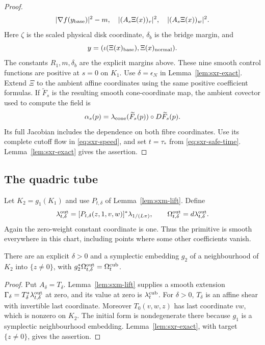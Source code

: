\begin{proof}
\[\begin{gathered}
 |\nabla f(y_{\rm base})|^2-m,\quad
 |(A_s\Xi(x))_v|^2,\quad |(A_s\Xi(x))_w|^2.
 \end{gathered}
\]
Here $\zeta$ is the scaled physical disk coordinate, $\delta_b$ is the bridge
margin, and
\[
 y=(\iota(\Xi(x)_{\rm base}),\Xi(x)_{\rm normal}).
\]
The constants $R_1,m,\delta_b$ are the explicit margins above. These nine smooth control functions are positive at $s=0$ on $K_1$.
Use $\delta=\epsilon_N$ in Lemma~\ref{lem:sxr-exact}.
Extend $\Xi$ to the ambient affine coordinates using the same positive
coefficient formulas. If $\widetilde F_s$ is the resulting smooth cone-coordinate
map, the ambient covector used to compute the field is
\[
 \alpha_s(p)=\lambda_{\rm cone}(\widetilde F_s(p))\circ D\widetilde F_s(p).
\]
Its full Jacobian includes the dependence on both fibre coordinates.
Use its complete cutoff flow in \eqref{eq:sxr-speed}, and set $t=\tau_*$ from
\eqref{eq:sxr-safe-time}. Lemma~\ref{lem:sxr-exact} gives the assertion.
\end{proof}

\subsection{The quadric tube}\label{sec:sxr-return}

Let $K_2=g_1(K_1)$ and use $P_{t,\delta}$ of Lemma~\ref{lem:sxm-lift}.
Define
\[
 \lambda_{t,\delta}^{\rm out}
  =[P_{t,\delta}(z,1,v,w)]^*\lambda_{1/(L\pi)},\qquad
 \Omega_{t,\delta}^{\rm out}=d\lambda_{t,\delta}^{\rm out}.
\]
Again the zero-weight constant coordinate is one. Thus the primitive is smooth
everywhere in this chart, including points where some other coefficients vanish.

\begin{proposition}\label{prop:sxr-quadric-return}
There are an explicit $\delta>0$ and a symplectic embedding $g_2$ of a
neighbourhood of $K_2$ into $\{z\ne0\}$, with
$g_2^*\Omega_{t,\delta}^{\rm out}=\Omega_t^{\rm cub}$.
\end{proposition}

\begin{proof}
Put $A_\delta=T_\delta$. Lemma~\ref{lem:sxm-lift} supplies a smooth extension
$\Gamma_\delta=T_\delta^*\lambda_{t,\delta}^{\rm out}$ at zero, and its value at
zero is $\lambda_t^{\rm cub}$.
For $\delta>0$, $T_\delta$ is an affine shear with invertible last coordinate.
Moreover $T_0(v,w,z)$ has last coordinate $vw$, which is nonzero on $K_2$.
The initial form is nondegenerate there because $g_1$ is a symplectic
neighbourhood embedding. Lemma~\ref{lem:sxr-exact}, with target $\{z\ne0\}$,
gives the assertion.
\end{proof}


